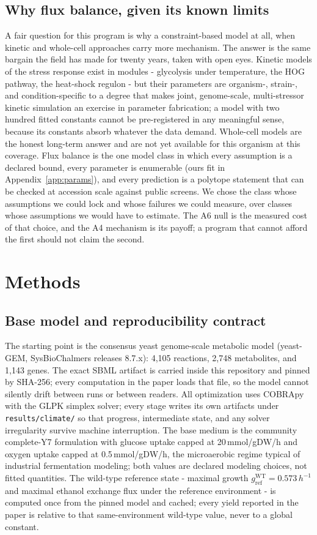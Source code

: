 \documentclass[12pt]{article}
\begin{document}
\subsection{Why flux balance, given its known limits}

A fair question for this program is why a constraint-based model at
all, when kinetic and whole-cell approaches carry more mechanism. The
answer is the same bargain the field has made for twenty years,
taken with open eyes. Kinetic models of the stress response exist in
modules - glycolysis under temperature, the HOG pathway, the
heat-shock regulon - but their parameters are organism-, strain-,
and condition-specific to a degree that makes joint, genome-scale,
multi-stressor kinetic simulation an exercise in parameter
fabrication; a model with two hundred fitted constants cannot be
pre-registered in any meaningful sense, because its constants absorb
whatever the data demand. Whole-cell models are the honest long-term
answer and are not yet available for this organism at this coverage.
Flux balance is the one model class in which every assumption is a
declared bound, every parameter is enumerable (ours fit in
Appendix~\ref{app:params}), and every prediction is a polytope
statement that can be checked at accession scale against public
screens. We chose the class whose assumptions we could lock and whose
failures we could measure, over classes whose assumptions we would
have to estimate. The A6 null is the measured cost of that choice,
and the A4 mechanism is its payoff; a program that cannot afford the
first should not claim the second.

\section{Methods}
\label{sec:methods}

\subsection{Base model and reproducibility contract}

The starting point is the consensus yeast genome-scale metabolic model
(yeast-GEM, SysBioChalmers releases 8.7.x): 4{,}105 reactions, 2{,}748
metabolites, and 1{,}143 genes. The exact SBML artifact is carried inside
this repository and pinned by SHA-256; every computation in the paper
loads that file, so the model cannot silently drift between runs or
between readers. All optimization uses COBRApy with the GLPK simplex
solver; every stage writes its own artifacts under
\texttt{results/climate/} so that progress, intermediate state, and any
solver irregularity survive machine interruption. The base medium is the
community complete-Y7 formulation with glucose uptake capped at
20\,mmol/gDW/h and oxygen uptake capped at 0.5\,mmol/gDW/h, the
microaerobic regime typical of industrial fermentation modeling; both
values are declared modeling choices, not fitted quantities. The
wild-type reference state - maximal growth $g^{\mathrm{WT}}_{\mathrm{ref}}
= 0.573\,h^{-1}$ and maximal ethanol exchange flux under the reference
environment - is computed once from the pinned model and cached; every
yield reported in the paper is relative to that same-environment
wild-type value, never to a global constant.
\end{document}
